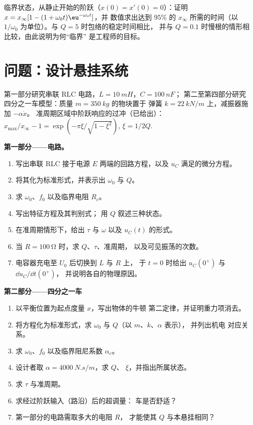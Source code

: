 \begin{exercise}[$\star\star\star$]\label{exo:b1:transient-regimes:12}
临界状态，从静止开始的阶跃（$x(0) = x'(0) = 0$）：证明
$x = x_\infty[1 - (1 + \omega_0 t)\eu^{-\omega_0 t}]$，并
数值求出达到 $95\%$ 的 $x_\infty$ 所需的时间（以
$1/\omega_0$ 为单位）。与 $Q = 5$ 时包络的稳定时间相比，
并与 $Q = 0.1$ 时慢根的情形相比较，由此说明为何“临界”
是工程师的目标。
\end{exercise}

\section{问题：设计悬挂系统}

\begin{problem}
\label{pb:b1:transient-regimes:1}
第一部分研究串联 RLC 电路，$L = \qty{10}{mH}$，$C = \qty{100}{nF}$；
第二至第四部分研究四分之一车模型：质量 $m = \qty{350}{kg}$ 的物块置于
弹簧 $k = \qty{22}{kN/m}$ 上，减振器施加 $-\alpha\dot x$。
准周期区域中阶跃响应的过冲（已给出）：
$x_{\max}/x_\infty - 1 = \exp(-\pi\xi/\sqrt{1 - \xi^2})$, $\xi = 1/2Q$.

\medskip
\noindent\textbf{第一部分——电路。}
\begin{enumerate}
  \item 写出串联 RLC 接于电源 $E$ 两端的回路方程，以及
        $u_C$ 满足的微分方程。
  \item 将其化为标准形式，并表示出 $\omega_0$ 与 $Q$。
  \item 求 $\omega_0$、$f_0$ 以及临界电阻 $R_c$。
  \item 写出特征方程及其判别式；
        用 $Q$ 叙述三种状态。
  \item 在准周期情形下，给出 $\tau$ 与 $\omega$ 以及
        $u_C(t)$ 的形式。
  \item 当 $R = \qty{100}{\ohm}$ 时，求 $Q$、$\tau$、准周期，
        以及可见振荡的次数。
  \item 电容器充电至 $U_0$ 后切换到 $L$ 与 $R$ 上，
        于 $t = 0$ 时给出 $u_C(0^+)$ 与 $\dd u_C/\dd t(0^+)$，
        并说明各自的物理原因。
\end{enumerate}

\medskip
\noindent\textbf{第二部分——四分之一车}
\begin{enumerate}[resume]
  \item 以平衡位置为起点度量 $x$，写出物体的牛顿
        第二定律，并证明重力项消去。
  \item 将方程化为标准形式，求 $\omega_0$ 与 $Q$（以 $m$、$k$、$\alpha$ 表示），
        并列出机电
        对应关系。
  \item 求 $\omega_0$、$f_0$ 以及临界阻尼系数
        $\alpha_c$。
  \item 设计者取 $\alpha = \qty{4000}{N.s/m}$，求 $Q$、
        $\xi$，并指出所属状态。
  \item 求 $\tau$ 与准周期。
  \item 求经过阶跃输入（路沿）后的超调量：
        车是否舒适？
  \item 第一部分的电路需取多大的电阻 $R$，
        才能使其 $Q$ 与本悬挂相同？
\end{enumerate}


\end{problem}
